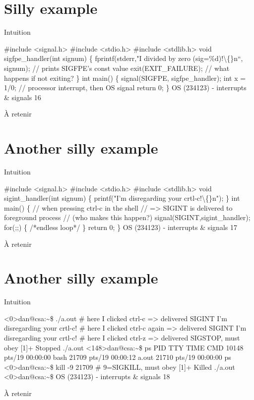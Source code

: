 \documentclass[12pt]{article}
\begin{document}
\section{Silly example}
\begin{myvulga}{Intuition}
\end{myvulga}
\#include <signal.h>
\#include <stdio.h>
\#include <stdlib.h>
void sigfpe\_handler(int signum) \{
fprintf(stderr,"I divided by zero (sig=\%d)!\textbackslash\{\}n“,
signum);    // prints SIGFPE’s const value
exit(EXIT\_FAILURE); // what happens if not exiting?
\}
int main() \{
signal(SIGFPE, sigfpe\_handler);
int x = 1/0; // processor interrupt, then OS signal
return 0;
\}
OS (234123) - interrupts \& signals
16
\begin{aretenir}{À retenir}
\end{aretenir}

\section{Another silly example}
\begin{myvulga}{Intuition}
\end{myvulga}
\#include <signal.h>
\#include <stdio.h>
\#include <stdlib.h>
void sigint\_handler(int signum) \{
printf("I’m disregarding your crtl-c!\textbackslash\{\}n");
\}
int main() \{
// when pressing ctrl-c in the shell
// => SIGINT is delivered to foreground process
// (who makes this happen?)
signal(SIGINT,sigint\_handler);
for(;;) \{ /*endless loop*/ \}
return 0;
\}
OS (234123) - interrupts \& signals
17
\begin{aretenir}{À retenir}
\end{aretenir}

\section{Another silly example}
\begin{myvulga}{Intuition}
\end{myvulga}
<0>dan@csa:\textasciitilde{}\$ ./a.out
\# here I clicked ctrl-c => delivered SIGINT
I’m disregarding your crtl-c!
\# here I clicked ctrl-c again => delivered SIGINT
I’m disregarding your crtl-c!
\# here I clicked ctrl-z => delivered SIGSTOP, must obey
[1]+  Stopped                 ./a.out
<148>dan@csa:\textasciitilde{}\$ ps
PID TTY          TIME CMD
10148 pts/19   00:00:00 bash
21709 pts/19   00:00:12 a.out
21710 pts/19   00:00:00 ps
<0>dan@csa:\textasciitilde{}\$ kill -9 21709   \# 9=SIGKILL, must obey
[1]+  Killed                  ./a.out
<0>dan@csa:\textasciitilde{}\$
OS (234123) - interrupts \& signals
18
\begin{aretenir}{À retenir}
\end{aretenir}
\end{document}
